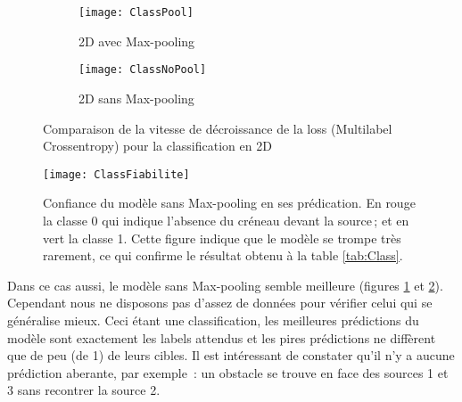\begin{figure}[!h]
\begin{subfigure}{.5\textwidth}
\centering
\texttt{[image: ClassPool]}  
\caption[2DPool]{2D avec Max-pooling}
\end{subfigure}
\begin{subfigure}{.5\textwidth}
\centering
\texttt{[image: ClassNoPool]}  
\caption[2DNoPool]{2D sans Max-pooling}
\end{subfigure}

\centering
\decoRule
\caption[ClassLoss]{Comparaison de la vitesse de décroissance de la loss (Multilabel Crossentropy) pour la classification en 2D}
\label{fig:ClassLoss}
\end{figure}


\begin{figure}[H] 
\centering
\texttt{[image: ClassFiabilite]} 
\decoRule
\caption[ClassFiabilite]{Confiance du modèle sans Max-pooling en ses prédication. En rouge la classe 0 qui indique l'absence du créneau devant la source ; et en vert la classe 1. Cette figure indique que le modèle se trompe très rarement, ce qui confirme le résultat obtenu à la table \ref{tab:Class}.}
\label{fig:ClassFiabilite}
\end{figure}


Dans ce cas aussi, le modèle sans Max-pooling semble meilleure (figures \ref{fig:ClassLoss} et \ref{fig:ClassFiabilite}). Cependant nous ne disposons pas d'assez de données pour vérifier celui qui se généralise mieux. Ceci étant une classification, les meilleures prédictions du modèle sont exactement les labels attendus et les pires prédictions ne diffèrent que de peu (de 1) de leurs cibles. Il est intéressant de constater qu'il n'y a aucune prédiction aberante, par exemple : un obstacle se trouve en face des sources 1 et 3 sans recontrer la source 2.


